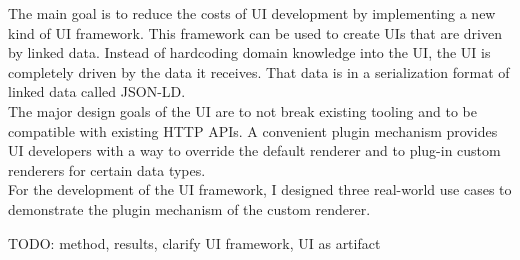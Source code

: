 The main goal is to reduce the costs of UI development by implementing a new kind of UI framework. This framework can be used to create UIs that are driven by linked data. Instead of hardcoding domain knowledge into the UI, the UI is completely driven by the data it receives. That data is in a serialization format of linked data called JSON-LD.\\
The major design goals of the UI are to not break existing tooling and to be compatible with existing HTTP APIs. A convenient plugin mechanism provides UI developers with a way to override the default renderer and to plug-in custom renderers for certain data types.\\
For the development of the UI framework, I designed three real-world use cases to demonstrate the plugin mechanism of the custom renderer.


TODO: method, results, clarify UI framework, UI as artifact
